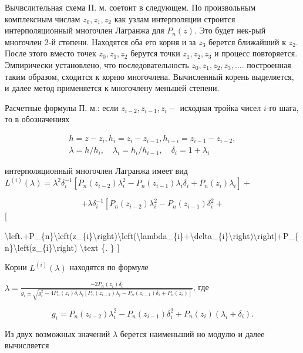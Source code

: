 \documentclass[10pt]{article}
\begin{document}
Вычвслительная схема П. м. соетоит в следующем. По произвольным комплексным числам $z_{0}, z_{1}, z_{2}$ как узлам интерполяции строится интерполяционный многочлен Лагранжа для $P_{n}(z)$. Это будет нек-рый многочлен 2-й стөпени. Находятся оба его корня и за $z_{3}$ берется ближайший к $z_{2}$. После этого вместо точек $z_{0}, z_{1}, z_{2}$ берутся точки $z_{1}, z_{2}, z_{3}$ и процесс повторяется. Эмпирически установлено, что последовательность $z_{0}, z_{1}, z_{2}, z_{3}, \ldots$. построенная таким образом, сходится к корню многочлена. Вычисленный корень выделяется, и далее метод применяется к многочлену меньшей степени.

Расчетные формулы П. м.: если $z_{i-2}, z_{i-1}, z_{i}-$ исходная тройка чисел $i$-го шага, то в обозначениях

\[
\begin{gathered}
h=z-z_{i}, h_{i}=z_{i}-z_{i-1}, h_{i-i}=z_{i-1}-z_{i-2}, \\
\lambda=h / h_{i}, \quad \lambda_{i}=h_{i} / h_{i-1}, \quad \delta_{i}=1+\lambda_{i}
\end{gathered}
\]

интерполяционный многочлен Лагранжа имеет вид $L^{(i)}(\lambda)=\lambda^{2} \delta_{i}^{-1}\left[P_{n}\left(z_{i-2}\right) \lambda_{i}^{2}-P_{n}\left(z_{i-1}\right) \lambda_{i} \delta_{i}+P_{n}\left(z_{i}\right) \lambda_{i}\right]+$

\[
+\lambda \delta_{i}^{-1}\left[P_{n}\left(z_{i-2}\right) \lambda_{i}^{2}-P_{n}\left(z_{i-1}\right) \delta_{i}^{2}+\right.
\][

\textbackslash left.+P\_\{n\}\textbackslash left(z\_\{i\}\textbackslash right)\textbackslash left(\textbackslash lambda\_\{i\}+\textbackslash delta\_\{i\}\textbackslash right)\textbackslash right]+P\_\{n\}\textbackslash left(z\_\{i\}\textbackslash right) \textbackslash text \{. \}
]

Корни $L^{(i)}(\lambda)$ находятся по формуле

$\lambda=\frac{-2 P_{n}\left(z_{i}\right) \delta_{i}}{g_{i} \pm \sqrt{g_{i}^{2}-4 P_{n}\left(z_{i}\right) \delta_{i} \lambda_{i}\left[P_{n}\left(z_{i-2}\right) \lambda_{i}-P_{n}\left(z_{i-1}\right) \delta_{i}+P_{n}\left(z_{i}\right)\right]}}$, где

\[
g_{i}=P_{n}\left(z_{i-2}\right) \lambda_{i}^{2}-P_{n}\left(z_{i-1}\right) \delta_{i}^{2}+P_{n}\left(z_{i}\right)\left(\lambda_{i}+\delta_{i}\right) .
\]

Из двух возможных значений $\lambda$ берется наименьший но модулю и далее вычисляется
\end{document}

